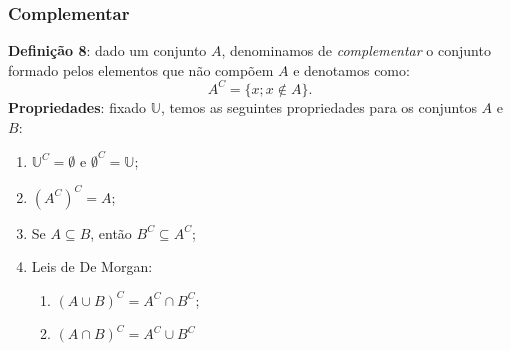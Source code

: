 \documentclass[13pt,letterpaper]{article}
\begin{document}
\subsubsection{Complementar}
\textbf{Definição 8}: dado um conjunto $A$, denominamos de \emph{complementar} o conjunto formado pelos elementos que não compõem $A$ e denotamos como:
\begin{displaymath}
    A^C = \{x; x \notin A\}.
\end{displaymath}
\textbf{Propriedades}: fixado $\mathbb{U}$, temos as seguintes propriedades para os conjuntos $A$ e $B$:
\begin{enumerate}
    \item $\mathbb{U}^C = \emptyset$ e $\emptyset^C = \mathbb{U}$;
    \item $(A^C)^C = A$;
    \item Se $A \subseteq B$, então $B^C \subseteq A^C$;
    \item Leis de De Morgan:
    \begin{enumerate}
        \item $(A \cup B)^C = A^C \cap B^C$;
        \item $(A \cap B)^C = A^C \cup B^C$
    \end{enumerate}
\end{enumerate}
\end{document}
